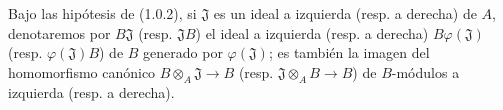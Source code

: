 \begin{env}[1.0.3]
\label{0.1.0.3-fr}
Bajo las hipótesis de (1.0.2), si $\mathfrak{J}$ es un ideal a izquierda (resp. a derecha) de $A$, denotaremos por $B\mathfrak{J}$ (resp. $\mathfrak{J}B$) el ideal a izquierda (resp. a derecha) $B\varphi(\mathfrak{J})$ (resp. $\varphi(\mathfrak{J})B$) de $B$ generado por $\varphi(\mathfrak{J})$; es también la imagen del homomorfismo canónico $B\otimes_A\mathfrak{J}\to B$ (resp. $\mathfrak{J}\otimes_A B\to B$) de $B$-módulos a izquierda (resp. a derecha).
\end{env}
